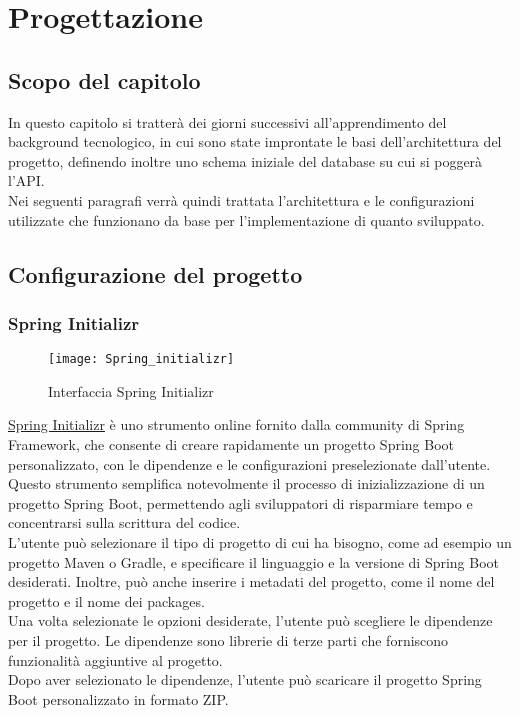 \chapter{Progettazione}
\label{cap:progettazione}

\section{Scopo del capitolo}
In questo capitolo si tratterà dei giorni successivi all'apprendimento del background tecnologico, in cui sono state improntate le basi dell'architettura del progetto, definendo inoltre uno schema iniziale del database su cui si poggerà l'API.\\
Nei seguenti paragrafi verrà quindi trattata l'architettura e le configurazioni utilizzate che funzionano da base per l'implementazione di quanto sviluppato.\\

\section{Configurazione del progetto}
\subsection{Spring Initializr}

\begin{figure}[!h] 
    \centering 
    \texttt{[image: Spring\_initializr]} 
    \caption{Interfaccia Spring Initializr}
\end{figure}

\noindent \href{https://start.spring.io/}{Spring Initializr} è uno strumento online fornito dalla community di Spring Framework, che consente di creare rapidamente un progetto Spring Boot personalizzato, con le dipendenze e le configurazioni preselezionate dall'utente. Questo strumento semplifica notevolmente il processo di inizializzazione di un progetto Spring Boot, permettendo agli sviluppatori di risparmiare tempo e concentrarsi sulla scrittura del codice.\\
L'utente può selezionare il tipo di progetto di cui ha bisogno, come ad esempio un progetto Maven o Gradle, e specificare il linguaggio e la versione di Spring Boot desiderati. Inoltre, può anche inserire i metadati del progetto, come il nome del progetto e il nome dei packages.\\
Una volta selezionate le opzioni desiderate, l'utente può scegliere le dipendenze per il progetto. Le dipendenze sono librerie di terze parti che forniscono funzionalità aggiuntive al progetto.\\
Dopo aver selezionato le dipendenze, l'utente può scaricare il progetto Spring Boot personalizzato in formato ZIP. 

